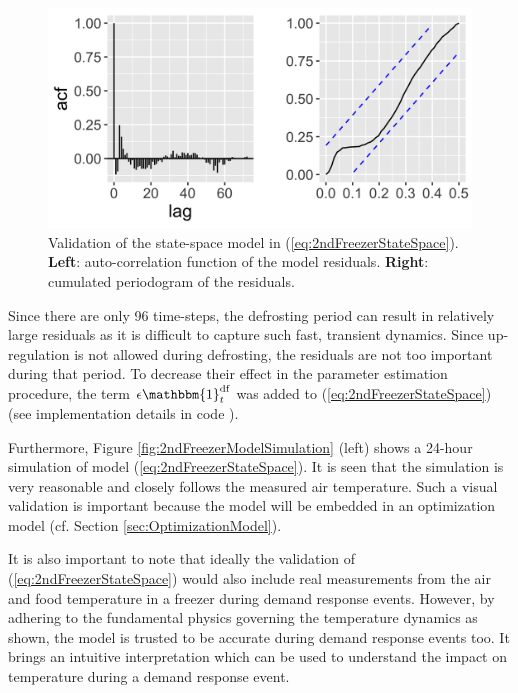 \begin{figure}[!t]
    \centering
    \includegraphics[width=\columnwidth]{../figures/2ndFreezerModelValidation.png}
    \caption{ Validation of the state-space model in (\ref{eq:2ndFreezerStateSpace}). \textbf{Left}: auto-correlation function of the model residuals. \textbf{Right}: cumulated periodogram of the residuals.}
    \label{fig:2ndFreezerModelValidation}
\end{figure}

Since there are only 96 time-steps, the defrosting period can result in relatively large residuals as it is difficult to capture such fast, transient dynamics. Since up-regulation is not allowed during defrosting, the residuals are not too important during that period. To decrease their effect in the parameter estimation procedure, the term $ \epsilon \mathbbm{1}^{\text{df}}_{t}$ was added to (\ref{eq:2ndFreezerStateSpace}) (see implementation details in code \cite{}).

Furthermore, Figure \ref{fig:2ndFreezerModelSimulation} (left) shows a 24-hour simulation of model (\ref{eq:2ndFreezerStateSpace}). It is seen that the simulation is very reasonable and closely follows the measured air temperature. Such a visual validation is important because the model will be embedded in an optimization model (cf. Section \ref{sec:OptimizationModel}).

It is also important to note that ideally the validation of (\ref{eq:2ndFreezerStateSpace}) would also include real measurements from the air and food temperature in a freezer during demand response events. However, by adhering to the fundamental physics governing the temperature dynamics as shown, the model is trusted to be accurate during demand response events too. It brings an intuitive interpretation which can be used to understand the impact on temperature during a demand response event.

